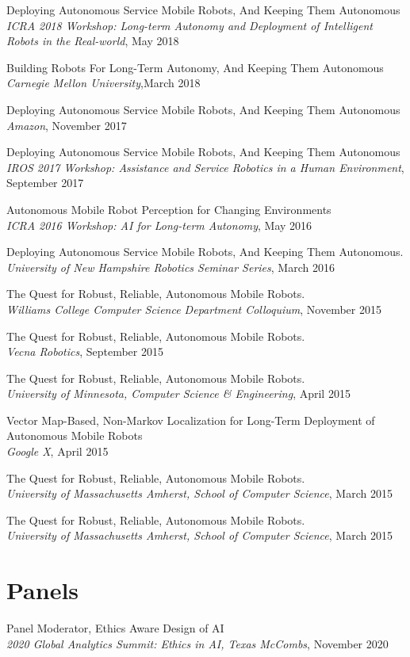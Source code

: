 \documentclass[Times]{article}
\begin{document}
Deploying Autonomous Service Mobile Robots, And Keeping Them Autonomous\\
{\em ICRA 2018 Workshop: Long-term Autonomy and Deployment of Intelligent Robots
in the Real-world}, May 2018

Building Robots For Long-Term Autonomy, And Keeping Them Autonomous\\
{\em Carnegie Mellon University},March 2018

Deploying Autonomous Service Mobile Robots, And Keeping Them Autonomous\\
{\em Amazon}, November 2017

Deploying Autonomous Service Mobile Robots, And Keeping Them Autonomous\\
{\em IROS 2017 Workshop: Assistance and Service Robotics in a Human
Environment}, September 2017

Autonomous Mobile Robot Perception for Changing Environments\\
{\em ICRA 2016 Workshop: AI for Long-term Autonomy}, May 2016

Deploying Autonomous Service Mobile Robots, And Keeping Them Autonomous.\\
{\em University of New Hampshire Robotics Seminar Series}, March 2016

The Quest for Robust, Reliable, Autonomous Mobile Robots.\\
{\em Williams College Computer Science Department Colloquium}, November 2015

The Quest for Robust, Reliable, Autonomous Mobile Robots.\\
{\em Vecna Robotics}, September 2015

The Quest for Robust, Reliable, Autonomous Mobile Robots.\\
{\em University of Minnesota, Computer Science \& Engineering}, April 2015

Vector Map-Based, Non-Markov Localization for Long-Term Deployment of Autonomous Mobile Robots\\
{\em Google X}, April 2015

The Quest for Robust, Reliable, Autonomous Mobile Robots.\\
{\em University of Massachusetts Amherst, School of Computer Science}, March 2015

The Quest for Robust, Reliable, Autonomous Mobile Robots.\\
{\em University of Massachusetts Amherst, School of Computer Science}, March 2015


\section*{Panels}
Panel Moderator, Ethics Aware Design of AI\\
{\em 2020 Global Analytics Summit: Ethics in AI, Texas McCombs}, November 2020
\end{document}

